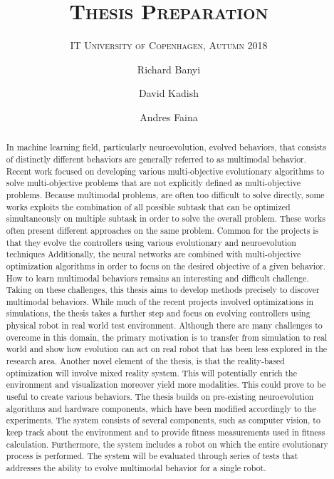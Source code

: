 \documentclass[format=acmsmall, review=false, screen=true]{acmart}
\author{Richard Banyi}
\affiliation{%
  \institution{IT University of Copenhagen}
  \streetaddress{Rued Langgaards Vej 7}
  \city{Copenhagen}
  \postcode{2300}
  \country{Denmark}
}
\author{David Kadish}
\affiliation{%
  \institution{Supervisor}
}
\affiliation{%
  \institution{IT University of Copenhagen}
}
\affiliation{%
  \institution{Robotics, Evolution, and Art Lab}
}
\author{Andres Faina}
\affiliation{%
  \institution{Supervisor}
}
\affiliation{%
  \institution{IT University of Copenhagen}
  \streetaddress{Rued Langgaards Vej 7}
  \city{Copenhagen}
  \postcode{2300}
  \country{Denmark}
}
\affiliation{%
  \institution{Robotics, Evolution, and Art Lab}
}
\title{\textsc{Thesis Preparation }}
\subtitle{\textsc{IT University of Copenhagen, Autumn 2018}}
\begin{document}
\begin{abstract}

In machine learning field, particularly neuroevolution, evolved behaviors, that consists of distinctly different behaviors  are generally referred to as multimodal behavior. Recent work focused on developing various multi-objective evolutionary algorithms to solve multi-objective problems that are not explicitly defined as multi-objective problems. Because multimodal problems, are often too difficult to solve directly, some works exploits the combination of all possible subtask that can be optimized simultaneously on multiple subtask in order to solve the overall problem. These works often present different approaches on the same problem. Common for the projects is that they evolve the controllers using various evolutionary and neuroevolution techniques Additionally, the neural networks are combined with multi-objective optimization algorithms in order to focus on the desired objective of a given behavior. How to learn multimodal behaviors remains an interesting and difficult challenge. Taking on these challenges, this thesis aims to develop methods precisely to discover multimodal behaviors. While much of the recent projects involved optimizations in simulations, the thesis takes a further step and focus on evolving controllers using physical robot in real world test environment. Although there are many challenges to overcome in this domain, the primary motivation is to transfer from simulation to real world and show how evolution can act on real robot that has been less explored in the research area. Another novel element of the thesis, is that the reality-based optimization will involve mixed reality system. This will potentially enrich the environment and visualization moreover yield more modalities. This could prove to be useful to create various behaviors. The thesis builds on pre-existing neuroevolution algorithms and hardware components, which have been modified accordingly to the experiments. The system consists of several components, such as computer vision, to keep track about the environment and to provide fitness measurements used in fitness calculation. Furthermore, the system includes a robot on which the entire evolutionary process is performed. The system will be evaluated through series of tests that addresses the ability to evolve multimodal behavior for a single robot.

\end{abstract}

\maketitle
\end{document}
